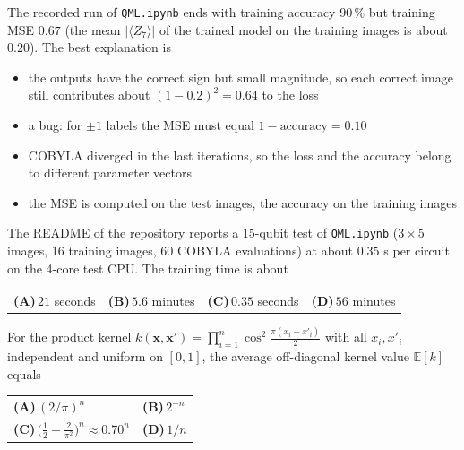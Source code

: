 \documentclass[11pt,a4paper]{article}
\newcommand{\optlabel}[1]{\textbf{(#1)}}
\newenvironment{qitem}[1]{\begin{list}{}{\setlength{\leftmargin}{3.3em}\setlength{\labelwidth}{3.1em}%
  \setlength{\labelsep}{0.2em}\setlength{\topsep}{3pt}\setlength{\parsep}{3pt}}\item[\textbf{Q.#1}\hfill]}{\end{list}}
\newcommand{\qsep}{\par\vspace{2pt}{\color{black!15}\hrule}\vspace{4pt}}
\begin{document}
\begin{qitem}{68}
The recorded run of \texttt{QML.ipynb} ends with training accuracy $90\,\%$ but training MSE $0.67$ (the mean
$|\langle Z_7\rangle|$ of the trained model on the training images is about $0.20$). The best explanation is
\begin{itemize}[leftmargin=2.6em, labelsep=0.4em, itemsep=2pt, topsep=3pt]
\item[\optlabel{A}] the outputs have the correct sign but small magnitude, so each correct image still contributes about $(1 - 0.2)^2 = 0.64$ to the loss
\item[\optlabel{B}] a bug: for $\pm1$ labels the MSE must equal $1 - \text{accuracy} = 0.10$
\item[\optlabel{C}] COBYLA diverged in the last iterations, so the loss and the accuracy belong to different parameter vectors
\item[\optlabel{D}] the MSE is computed on the test images, the accuracy on the training images
\end{itemize}
\end{qitem}
\qsep

\begin{qitem}{69}
The README of the repository reports a 15-qubit test of \texttt{QML.ipynb} ($3\times5$ images, 16 training images, 60 COBYLA
evaluations) at about $0.35$ s per circuit on the 4-core test CPU. The training time is about
\par\smallskip\noindent\begin{tabularx}{\linewidth}{@{}*{4}{L}@{}}
\optlabel{A}\,$21$ seconds & \optlabel{B}\,$5.6$ minutes & \optlabel{C}\,$0.35$ seconds & \optlabel{D}\,$56$ minutes
\end{tabularx}
\end{qitem}
\qsep

\begin{qitem}{70}
For the product kernel $k(\mathbf x, \mathbf x') = \prod_{i=1}^{n}\cos^2\frac{\pi(x_i - x'_i)}{2}$ with all $x_i, x'_i$ independent
and uniform on $[0, 1]$, the average off-diagonal kernel value $\mathbb E[k]$ equals
\par\smallskip\noindent\begin{tabularx}{\linewidth}{@{}*{2}{L}@{}}
\optlabel{A}\,$(2/\pi)^n$ & \optlabel{B}\,$2^{-n}$ \\[3pt]
\optlabel{C}\,$\big(\tfrac12 + \tfrac{2}{\pi^2}\big)^n \approx 0.70^n$ & \optlabel{D}\,$1/n$
\end{tabularx}
\end{qitem}
\qsep
\end{document}
